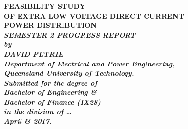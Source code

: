 \begin{titlepage}
\renewcommand{\baselinestretch}{1.0}
\begin{center}
\vspace*{35mm}
\Huge\bf
		FEASIBILITY STUDY\\
		OF EXTRA LOW VOLTAGE DIRECT CURRENT\\
		POWER DISTRIBUTION\\
\vspace{7mm}
\large\sl\bf
		SEMESTER 2 PROGRESS REPORT\\
\vspace{15mm}
\large\sl
		by\\
		DAVID PETRIE
		\medskip\\
\rm
		Department of Electrical and Power Engineering,\\
		Queensland University of Technology.\\
\vspace{30mm}
		Submitted for the degree of\\
		Bachelor of Engineering \& \\
		Bachelor of Finance (IX28)
		\smallskip\\ [2cm]
\normalsize
		in the division of \ldots
		\medskip\\
\large
		April \& 2017.		
\end{center}
\end{titlepage}